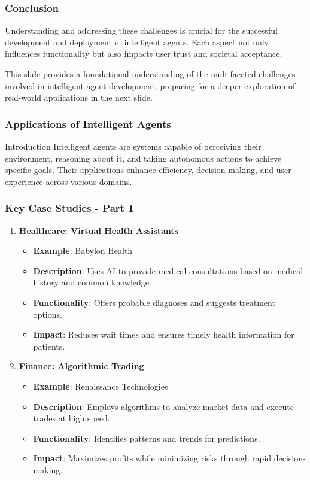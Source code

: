 \documentclass[aspectratio=169]{beamer}
\begin{document}
\begin{frame}[fragile]
    \frametitle{Conclusion}
    Understanding and addressing these challenges is crucial for the successful development and deployment of intelligent agents. Each aspect not only influences functionality but also impacts user trust and societal acceptance.
    
    This slide provides a foundational understanding of the multifaceted challenges involved in intelligent agent development, preparing for a deeper exploration of real-world applications in the next slide.
\end{frame}

\begin{frame}[fragile]
    \frametitle{Applications of Intelligent Agents}
    \begin{block}{Introduction}
        Intelligent agents are systems capable of perceiving their environment, reasoning about it, and taking autonomous actions to achieve specific goals. Their applications enhance efficiency, decision-making, and user experience across various domains.
    \end{block}
\end{frame}

\begin{frame}[fragile]
    \frametitle{Key Case Studies - Part 1}
    \begin{enumerate}
        \item \textbf{Healthcare: Virtual Health Assistants}
            \begin{itemize}
                \item \textbf{Example}: Babylon Health
                \item \textbf{Description}: Uses AI to provide medical consultations based on medical history and common knowledge.
                \item \textbf{Functionality}: Offers probable diagnoses and suggests treatment options.
                \item \textbf{Impact}: Reduces wait times and ensures timely health information for patients.
            \end{itemize}
    
        \item \textbf{Finance: Algorithmic Trading}
            \begin{itemize}
                \item \textbf{Example}: Renaissance Technologies
                \item \textbf{Description}: Employs algorithms to analyze market data and execute trades at high speed.
                \item \textbf{Functionality}: Identifies patterns and trends for predictions.
                \item \textbf{Impact}: Maximizes profits while minimizing risks through rapid decision-making.
            \end{itemize}
    \end{enumerate}
\end{frame}
\end{document}
